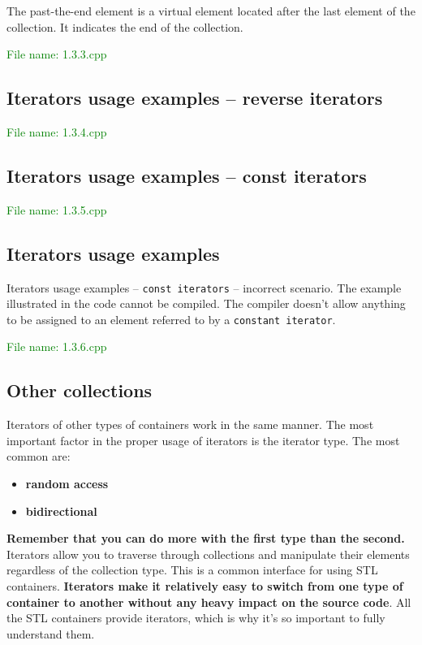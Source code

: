 The past-the-end element is a virtual element located after the last element of the collection. It indicates 
the end of the collection.

\textcolor{green}{File name: 1.3.3.cpp}


\subsection{Iterators usage examples – reverse iterators} %
\textcolor{green}{File name: 1.3.4.cpp}


\subsection{Iterators usage examples – const iterators} %
\textcolor{green}{File name: 1.3.5.cpp}


\subsection{Iterators usage examples} %
Iterators usage examples – \texttt{const iterators} – incorrect scenario.
The example illustrated in the code cannot be compiled. The compiler doesn’t allow anything to be assigned 
to an element referred to by a \texttt{constant iterator}.

\textcolor{green}{File name: 1.3.6.cpp}


\subsection{Other collections} %
Iterators of other types of containers work in the same manner. The most important factor in the proper usage 
of iterators is the iterator type. The most common are:
\begin{itemize}
    \item \textbf{random access}
    \item \textbf{bidirectional}
\end{itemize}
\textbf{Remember that you can do more with the first type than the second.}
Iterators allow you to traverse through collections and manipulate their elements regardless of the 
collection type. This is a common interface for using STL containers.
\textbf{Iterators make it relatively easy to switch from one type of container to another without any 
heavy impact on the source code}. All the STL containers provide iterators, which is why it’s so 
important to fully understand them.

